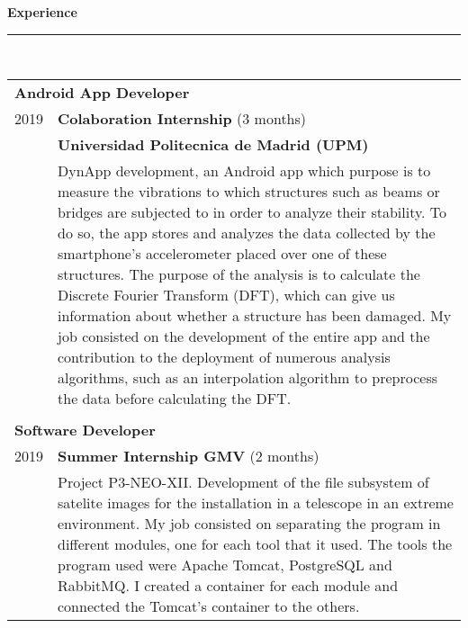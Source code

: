 \documentclass{article}
\begin{document}
\begin{minipage}[t]{0.66\linewidth}
  \setlength{\parskip}{0.3em}

  \textbf{\Large{\color{BlueViolet}Experience}}\\[-0.25cm]
  {\color{BlueViolet} \rule{\linewidth}{0.1mm} }\\[-0.05cm]
  \begin{tabular}{l l}
    \multicolumn{2}{p{6cm}}{\hspace{0.40cm} \textbf{Android App Developer}}\\[0.1cm]
    2019 & \textbf{Colaboration Internship} (3 months)\\
         & \textbf{Universidad Politecnica de Madrid (UPM)} \\
         & \multicolumn{1}{p{11cm}}{DynApp development, an Android app which purpose is to measure the vibrations to which structures such as beams or bridges are subjected to in order to analyze their stability. To do so, the app stores and analyzes the data collected by the smartphone's accelerometer placed over one of these structures. The purpose of the analysis is to calculate the Discrete Fourier Transform (DFT), which can give us information about whether a structure has been damaged. My job consisted on the development of the entire app and the contribution to the deployment of numerous analysis algorithms, such as an interpolation algorithm to preprocess the data before calculating the DFT.}\\ \\[-0.1cm]
    \multicolumn{2}{p{6cm}}{\hspace{0.40cm} \textbf{Software Developer}}\\[0.1cm]
    2019 & \textbf{Summer Internship GMV} (2 months)\\
         & \multicolumn{1}{p{11cm}}{Project P3-NEO-XII. Development of the file subsystem of satelite images for the installation in a telescope in an extreme environment. My job consisted on separating the program in different modules, one for each tool that it used. The tools the program used were Apache Tomcat, PostgreSQL and RabbitMQ. I created a container for each module and connected the Tomcat's container to the others.} \\
  \end{tabular}
  \vspace{0.3cm}
  

\end{minipage}
\end{document}
